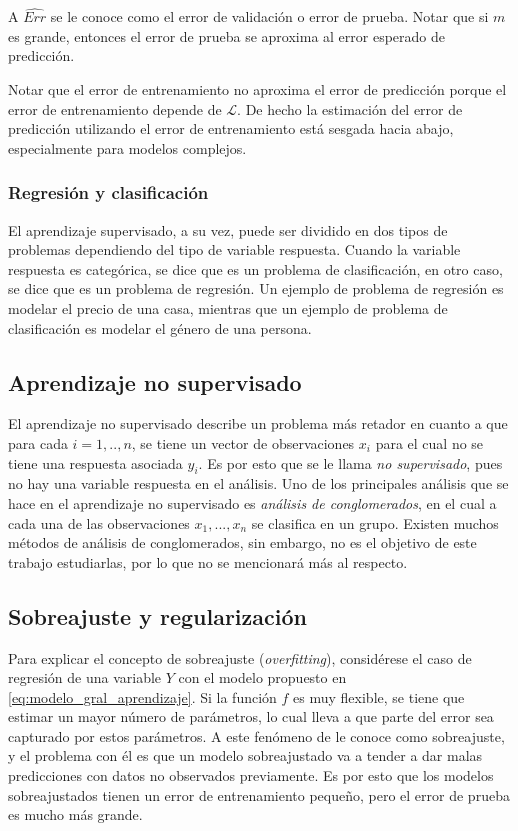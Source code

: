 A $\hat{Err}$ se le conoce como el error de validación o error de prueba. Notar que si $m$ es grande, entonces el error de prueba se aproxima al error esperado de predicción.

Notar que el error de entrenamiento no aproxima el error de predicción porque el error de entrenamiento depende de $\mathcal{L}$. De hecho la estimación del error de predicción utilizando el error de entrenamiento está sesgada hacia abajo, especialmente para modelos complejos.

\subsubsection{Regresión y clasificación}

El aprendizaje supervisado, a su vez, puede ser dividido en dos tipos de problemas dependiendo del tipo de variable respuesta. Cuando la variable respuesta es categórica, se dice que es un problema de clasificación, en otro caso, se dice que es un problema de regresión. Un ejemplo de problema de regresión es modelar el precio de una casa, mientras que un ejemplo de problema de clasificación es modelar el género de una persona. 

\subsection{Aprendizaje no supervisado}

El aprendizaje no supervisado describe un problema más retador en cuanto a que para cada $i = 1, .., n$, se tiene un vector de observaciones $x_i$ para el cual no se tiene una respuesta asociada $y_i$. Es por esto que se le llama \textit{no supervisado}, pues no hay una variable respuesta en el análisis. Uno de los principales análisis que se hace en el aprendizaje no supervisado es \textit{análisis de conglomerados}, en el cual a cada una de las observaciones $x_1, ..., x_n$ se clasifica en un grupo. Existen muchos métodos de análisis de conglomerados, sin embargo, no es el objetivo de este trabajo estudiarlas, por lo que no se mencionará más al respecto.


\subsection{Sobreajuste y regularización}

Para explicar el concepto de sobreajuste (\textit{overfitting}), considérese el caso de regresión de una variable $Y$ con el modelo propuesto en \ref{eq:modelo_gral_aprendizaje}. Si la función $f$ es muy flexible, se tiene que estimar un mayor número de parámetros, lo cual lleva a que parte del error sea capturado por estos parámetros. A este fenómeno de le conoce como sobreajuste, y el problema con él es que un modelo sobreajustado va a tender a dar malas predicciones con datos no observados previamente. Es por esto que los modelos sobreajustados tienen un error de entrenamiento pequeño, pero el error de prueba es mucho más grande.

